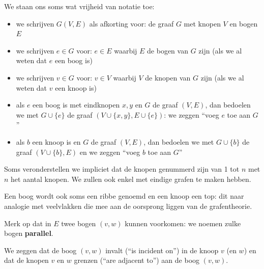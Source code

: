 We staan ons soms wat vrijheid van notatie toe:
\begin{itemize}
\item
we schrijven $G(V,E)$ als afkorting voor: de graaf $G$ met knopen $V$ en bogen $E$
\item
we schrijven $e \in G$ voor: $e \in E$ waarbij $E$ de bogen van $G$ zijn (als we al
weten dat $e$ een boog is)
\item
we schrijven $v \in G$ voor: $v \in V$ waarbij $V$ de knopen van $G$ zijn (als we al
weten dat $v$ een knoop is)
\item
als $e$ een boog is met eindknopen $x,y$ en $G$ de graaf $(V,E)$, dan
bedoelen we met $G \cup \{e\}$ de graaf $(V \cup \{x,y\},E \cup \{e\})$:
we zeggen ``voeg $e$ toe aan $G$''
\item
als $b$ een knoop is en $G$ de graaf $(V,E)$, dan bedoelen we met $G
\cup \{b\}$ de graaf $(V \cup \{b\},E )$ en we zeggen ``voeg $b$ toe
aan $G$''
\end{itemize}

Soms veronderstellen we impliciet dat de knopen genummerd zijn van 1
tot $n$ met $n$ het aantal knopen. We zullen ook enkel met eindige
grafen te maken hebben.



Een boog wordt ook soms een ribbe genoemd en een knoop een top: dit
naar analogie met veelvlakken die mee aan de oorsprong liggen van de
grafentheorie.


Merk op dat in $E$ twee bogen $(v,w)$ kunnen voorkomen: we noemen zulke
bogen \textbf{parallel}.

We zeggen dat de boog $(v,w)$ invalt (``is incident on'') in de knoop $v$ (en
$w$) en dat de knopen $v$ en $w$ grenzen (``are adjacent to'') aan de boog
$(v,w)$.





